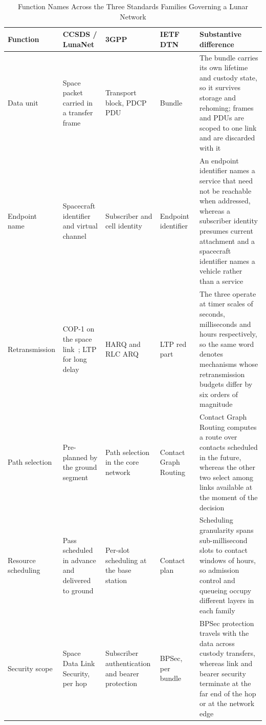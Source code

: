 \documentclass[11pt,a4paper]{article}
\begin{document}
\begin{table}[!t]
\caption{Function Names Across the Three Standards Families Governing a Lunar Network}
\label{tab:rosetta}
\centering
\footnotesize
\begin{tabularx}{\textwidth}{@{}>{\raggedright\arraybackslash}p{1.9cm}>{\raggedright\arraybackslash}p{2.9cm}>{\raggedright\arraybackslash}p{2.6cm}>{\raggedright\arraybackslash}p{2.5cm}>{\raggedright\arraybackslash}X@{}}
\toprule
Function & CCSDS / LunaNet & 3GPP & IETF DTN & Substantive difference \\
\midrule
Data unit & Space packet carried in a transfer frame~\cite{ccsds_tm,ccsds_uslp} & Transport block, PDCP PDU & Bundle~\cite{rfc9171} & The bundle carries its own lifetime and custody state, so it survives storage and rehoming; frames and PDUs are scoped to one link and are discarded with it \\
Endpoint name & Spacecraft identifier and virtual channel~\cite{ccsds_uslp} & Subscriber and cell identity & Endpoint identifier~\cite{rfc9171} & An endpoint identifier names a service that need not be reachable when addressed, whereas a subscriber identity presumes current attachment and a spacecraft identifier names a vehicle rather than a service \\
Retransmission & COP-1 on the space link~\cite{ccsds_tc}; LTP for long delay~\cite{ccsds_ltp} & HARQ and RLC ARQ & LTP red part~\cite{rfc5326} & The three operate at timer scales of seconds, milliseconds and hours respectively, so the same word denotes mechanisms whose retransmission budgets differ by six orders of magnitude \\
Path selection & Pre-planned by the ground segment & Path selection in the core network & Contact Graph Routing~\cite{burleigh_cgr} & Contact Graph Routing computes a route over contacts scheduled in the future, whereas the other two select among links available at the moment of the decision \\
Resource scheduling & Pass scheduled in advance and delivered to ground~\cite{ccsds_sle} & Per-slot scheduling at the base station & Contact plan~\cite{fraire_contact_plan} & Scheduling granularity spans sub-millisecond slots to contact windows of hours, so admission control and queueing occupy different layers in each family \\
Security scope & Space Data Link Security, per hop & Subscriber authentication and bearer protection & BPSec, per bundle~\cite{rfc9172} & BPSec protection travels with the data across custody transfers, whereas link and bearer security terminate at the far end of the hop or at the network edge \\
\bottomrule
\end{tabularx}
\end{table}
\end{document}
